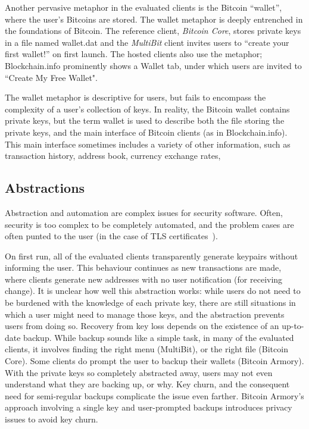 Another pervasive metaphor in the evaluated clients is the Bitcoin ``wallet'', where the user's Bitcoins are stored. The wallet metaphor is deeply entrenched in the foundations of Bitcoin. The reference client, \emph{Bitcoin Core}, stores private keys in a file named wallet.dat and the \emph{MultiBit} client invites users to ``create your first wallet!'' on first launch. The hosted clients also use the metaphor; Blockchain.info prominently shows a Wallet tab, under which users are invited to ``Create My Free Wallet".  

The wallet metaphor is descriptive for users, but fails to encompass the complexity of a user's collection of keys. In reality, the Bitcoin wallet contains private keys, but the term wallet is used to describe both the file storing the private keys, and the main interface of Bitcoin clients (as in Blockchain.info). This main interface sometimes includes a variety of other information, such as transaction history, address book, currency exchange rates, \etc


\subsection{Abstractions}

Abstraction and automation are complex issues for security software. Often, security is too complex to be completely automated, and the problem cases are often punted to the user (\eg in the case of TLS certificates~\cite{SSLSobey}).  

On first run, all of the evaluated clients transparently generate keypairs without informing the user. This behaviour continues as new transactions are made, where clients generate new addresses with no user notification (\eg for receiving change). It is unclear how well this abstraction works: while users do not need to be burdened with the knowledge of each private key, there are still situations in which a user might need to manage those keys, and the abstraction prevents users from doing so. Recovery from key loss depends on the existence of an up-to-date backup. While backup sounds like a simple task, in many of the evaluated clients, it involves finding the right menu (MultiBit), or the right file (Bitcoin Core). Some clients do prompt the user to backup their wallets (\eg Bitcoin Armory). With the private keys so completely abstracted away, users may not even understand what they are backing up, or why. Key churn, and the consequent need for semi-regular backups complicate the issue even farther. \eg Bitcoin Armory's approach involving a single key and user-prompted backups introduces privacy issues to avoid key churn.

